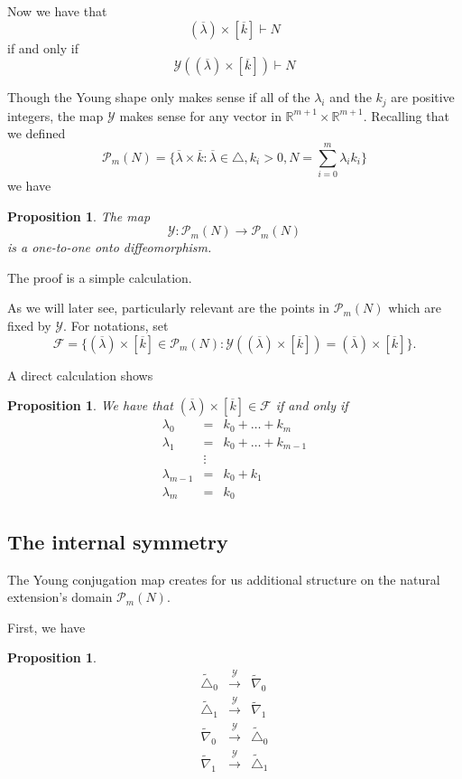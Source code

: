 \documentclass[12pt,oneside,openany]{article}
\newtheorem{prop}[theorem]{Proposition}
\def\R{{\mathbb R}} %
\begin{document}
    Now we have that 
   $$(\overline{\lambda})\times [\overline{k}] \vdash N$$
   if and only if 
   $$\mathcal{Y}\left((\overline{\lambda})\times [\overline{k}] \right) \vdash N$$
   
   
   Though the Young shape only makes sense if all of the $\lambda_i$ and the $ k_j$ are positive integers, the map $\mathcal{Y}$ makes sense for any vector in 
   $\R^{m+1} \times \R^{m+1}.  $
Recalling that we defined $$\mathcal{P}_m(N) = \{\overline{\lambda} \times \overline{k}: \overline{\lambda} \in \triangle, k_i>0, N = \sum_{i=0}^m \lambda_i k_i \} $$
we have 

\begin{prop} The map
$$\mathcal{Y}: \mathcal{P}_m(N) \rightarrow \mathcal{P}_m(N)$$
is a one-to-one onto diffeomorphism.
\end{prop}
The proof is a simple calculation.


As we will later see, particularly relevant are the points in  $\mathcal{P}_m(N)$ which are fixed by $\mathcal{Y}.$
For notations, set 
$$\mathcal{F} = \{ (\overline{\lambda}) \times [\overline{k}] \in \mathcal{P}_m(N): \mathcal{Y} ( (\overline{\lambda}) \times [\overline{k}] ) =  (\overline{\lambda}) \times [\overline{k}] \}.$$

A direct calculation shows  

\begin{prop} We have that  $ (\overline{\lambda}) \times [\overline{k}] \in \mathcal{F}$ if and only if 
\begin{eqnarray*}
\lambda_0 &=& k_0 + \ldots + k_{ m  }  \\
\lambda_1 &=& k_0 + \ldots + k_{ m  -1}  \\
& \vdots &   \\
\lambda_{m-1} &=& k_0 + k_1 \\
\lambda_m &=& k_0
\end{eqnarray*}
\end{prop}

\subsection{The internal symmetry}

The Young conjugation map creates for us additional structure on the natural extension's domain $\mathcal{P}_m(N)$.

First, we have


\begin{prop}\label{initial symmetry}
\begin{eqnarray*}
 \tilde{\triangle}_0 &\xrightarrow{\mathcal{Y}} &   \tilde{\nabla}_0 \\
\tilde{\triangle}_1&\xrightarrow{\mathcal{Y}} &\tilde{\nabla}_1 \\
 \tilde{\nabla}_0 &\xrightarrow{\mathcal{Y}} &  \tilde{\triangle}_0 \\
\tilde{\nabla}_1 &\xrightarrow{\mathcal{Y}} &  \tilde{\triangle}_1 \\
\end{eqnarray*}
\end{prop}
\end{document}
